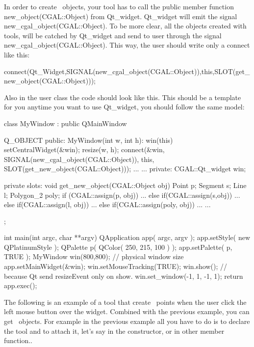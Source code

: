 In order to create \cgal\ objects, your tool has to call the public member 
function new\_object(CGAL::Object) from Qt\_widget. Qt\_widget will emit the 
signal new\_cgal\_object(CGAL::Object). To be more clear, all the objects 
created with tools, will be catched by Qt\_widget and send to user through the
 signal new\_cgal\_object(CGAL::Object). This way, the user should write only 
a connect like this:

connect(Qt\_Widget,SIGNAL(new\_cgal\_object(CGAL::Object)),this,SLOT(get\_new\_object(CGAL::Object)));

Also in the user class the code should look like this. This should be a 
template for you anytime you want to use Qt\_widget, you should follow the same
model:
\begin{ccExampleCode}
class MyWindow : public QMainWindow
{
  Q_OBJECT
public:
  MyWindow(int w, int h): win(this) {
    setCentralWidget(&win);
    resize(w, h);
    connect(&win, SIGNAL(new_cgal_object(CGAL::Object)), 
      this, SLOT(get_new_object(CGAL::Object)));
   ...
  }
  ...
private:
  CGAL::Qt_widget	  win;		

private slots:
  void get_new_object(CGAL::Object obj)
  {
    Point p;
    Segment s;
    Line l;
    Polygon_2 poly;
    if (CGAL::assign(p, obj)) {
       ...
    } else if(CGAL::assign(s,obj)) {
       ...      
    } else if(CGAL::assign(l, obj)) {
       ...
    } else if(CGAL::assign(poly, obj)) {
       ...
    }
    ...
  }
};

int
main(int argc, char **argv)
{
  QApplication app( argc, argv );
    app.setStyle( new QPlatinumStyle );
    QPalette p( QColor( 250, 215, 100 ) );
    app.setPalette( p, TRUE );
  MyWindow win(800,800); // physical window size
  app.setMainWidget(&win);
  win.setMouseTracking(TRUE);
  win.show();
  // because Qt send resizeEvent only on show.
  win.set_window(-1, 1, -1, 1);
  return app.exec();
}

\end{ccExampleCode}

The following is an example of a tool that create \cgal\ points when the user 
click the left mouse button over the widget. Combined with the previous 
example, you can get \cgal\ objects. For example in the previous example all 
you have to do is to declare the tool and to attach it, let's say in the 
constructor, or in other member function..
 
